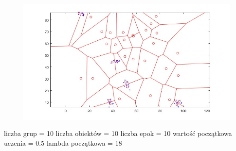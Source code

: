 \documentclass[11pt]{article}
\begin{document}
\begin{figure}[h!]
  \includegraphics{screeny/NeuralGas/Neural_gasp_5_groups/Neural_gasp_Areas.jpg}
\end{figure}

liczba grup = 10 liczba obiektów = 10 liczba epok = 10 wartość
początkowa uczenia = 0.5 lambda początkowa = 18
\end{document}
